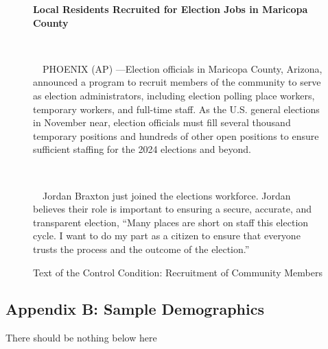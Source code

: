 \documentclass[
  11pt,
  a4paper,
]{scrartcl}
\begin{document}
\begin{figure}
\begin{minipage}{0.50\linewidth}
\textbf{Local Residents Recruited for Election Jobs in Maricopa
County}\\
\strut \\
\strut ~~PHOENIX (AP) ---Election officials in Maricopa County, Arizona,
announced a program to recruit members of the community to serve as
election administrators, including election polling place workers,
temporary workers, and full-time staff. As the U.S. general elections in
November near, election officials must fill several thousand temporary
positions and hundreds of other open positions to ensure sufficient
staffing for the 2024 elections and beyond.\\
\strut \\
\strut ~~Jordan Braxton just joined the elections workforce. Jordan
believes their role is important to ensuring a secure, accurate, and
transparent election, ``Many places are short on staff this election
cycle. I want to do my part as a citizen to ensure that everyone trusts
the process and the outcome of the election.''

Text of the Control Condition: Recruitment of Community
Members\end{minipage}%

\end{figure}%

\subsection{Appendix B: Sample Demographics}\label{sec-appendix-b}

There should be nothing below here
\end{document}
